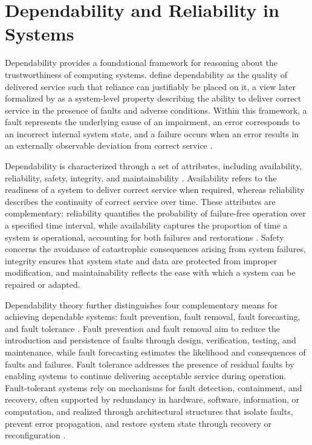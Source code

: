 \section{Dependability and Reliability in Systems}
\label{sec:background-dependability}

Dependability provides a foundational framework for reasoning about the trustworthiness of computing systems. \citet{laprie1985dependable} define dependability as the quality of delivered service such that reliance can justifiably be placed on it, a view later formalized by \citet{avizienis2001fundamental,avizienis2004basic} as a system-level property describing the ability to deliver correct service in the presence of faults and adverse conditions. Within this framework, a fault represents the underlying cause of an impairment, an error corresponds to an incorrect internal system state, and a failure occurs when an error results in an externally observable deviation from correct service \cite{avizienis2004basic}. 

Dependability is characterized through a set of attributes, including availability, reliability, safety, integrity, and maintainability \cite{avizienis2004basic}. Availability refers to the readiness of a system to deliver correct service when required, whereas reliability describes the continuity of correct service over time. These attributes are complementary: reliability quantifies the probability of failure-free operation over a specified time interval, while availability captures the proportion of time a system is operational, accounting for both failures and restorations \cite{laprie1985dependable}. Safety concerns the avoidance of catastrophic consequences arising from system failures, integrity ensures that system state and data are protected from improper modification, and maintainability reflects the ease with which a system can be repaired or adapted.

Dependability theory further distinguishes four complementary means for achieving dependable systems: fault prevention, fault removal, fault forecasting, and fault tolerance \cite{avizienis2004basic}. Fault prevention and fault removal aim to reduce the introduction and persistence of faults through design, verification, testing, and maintenance, while fault forecasting estimates the likelihood and consequences of faults and failures. Fault tolerance addresses the presence of residual faults by enabling systems to continue delivering acceptable service during operation. Fault-tolerant systems rely on mechanisms for fault detection, containment, and recovery, often supported by redundancy in hardware, software, information, or computation, and realized through architectural structures that isolate faults, prevent error propagation, and restore system state through recovery or reconfiguration \cite{nelson2002fault,hanmer2013patterns}.


